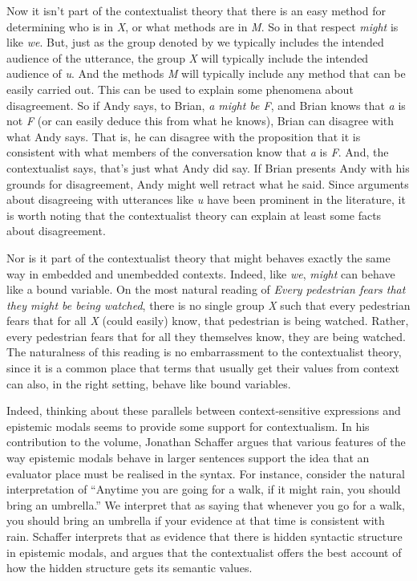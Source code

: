 \documentclass[
  11pt,
  letterpaper,
  DIV=11,
  numbers=noendperiod,
  twoside]{scrartcl}
\begin{document}
Now it isn't part of the contextualist theory that there is an easy
method for determining who is in \emph{X}, or what methods are in
\emph{M}. So in that respect \emph{might} is like \emph{we}. But, just
as the group denoted by we typically includes the intended audience of
the utterance, the group \emph{X} will typically include the intended
audience of \emph{u}. And the methods \emph{M} will typically include
any method that can be easily carried out. This can be used to explain
some phenomena about disagreement. So if Andy says, to Brian, \emph{a
might be F}, and Brian knows that \emph{a} is not \emph{F} (or can
easily deduce this from what he knows), Brian can disagree with what
Andy says. That is, he can disagree with the proposition that it is
consistent with what members of the conversation know that \emph{a} is
\emph{F}. And, the contextualist says, that's just what Andy did say. If
Brian presents Andy with his grounds for disagreement, Andy might well
retract what he said. Since arguments about disagreeing with utterances
like \emph{u} have been prominent in the literature, it is worth noting
that the contextualist theory can explain at least some facts about
disagreement.

Nor is it part of the contextualist theory that might behaves exactly
the same way in embedded and unembedded contexts. Indeed, like
\emph{we}, \emph{might} can behave like a bound variable. On the most
natural reading of \emph{Every pedestrian fears that they might be being
watched}, there is no single group \emph{X} such that every pedestrian
fears that for all \emph{X} (could easily) know, that pedestrian is
being watched. Rather, every pedestrian fears that for all they
themselves know, they are being watched. The naturalness of this reading
is no embarrassment to the contextualist theory, since it is a common
place that terms that usually get their values from context can also, in
the right setting, behave like bound variables.

Indeed, thinking about these parallels between context-sensitive
expressions and epistemic modals seems to provide some support for
contextualism. In his contribution to the volume, Jonathan Schaffer
argues that various features of the way epistemic modals behave in
larger sentences support the idea that an evaluator place must be
realised in the syntax. For instance, consider the natural
interpretation of ``Anytime you are going for a walk, if it might rain,
you should bring an umbrella.'' We interpret that as saying that
whenever you go for a walk, you should bring an umbrella if your
evidence at that time is consistent with rain. Schaffer interprets that
as evidence that there is hidden syntactic structure in epistemic
modals, and argues that the contextualist offers the best account of how
the hidden structure gets its semantic values.
\end{document}
